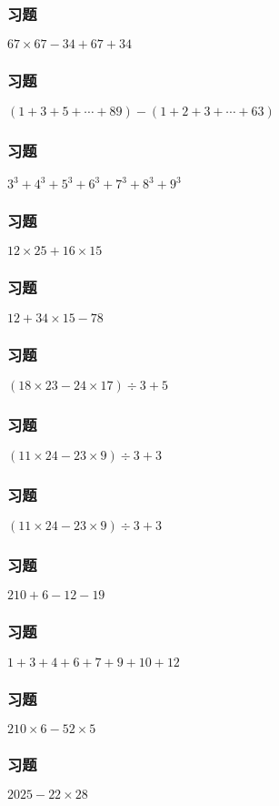 \begin{frame}
    \frametitle{习题\theframecounter}    \centering\textit{\Large $67\times 67 - 34 + 67 + 34$}
\end{frame}

\begin{frame}
    \frametitle{习题\theframecounter}    \centering\textit{\Large $(1+3+5+\cdots + 89) - (1+2+3+\cdots + 63)$}
\end{frame}

\begin{frame}
    \frametitle{习题\theframecounter}    \centering\textit{\Large $3^3 + 4^3 + 5^3 + 6^3 + 7^3 + 8^3 + 9^3$}
\end{frame}

\begin{frame}
    \frametitle{习题\theframecounter}    \centering\textit{\Large $12\times 25 + 16\times 15$}
\end{frame}

\begin{frame}
    \frametitle{习题\theframecounter}    \centering\textit{\Large $12 + 34\times 15 -78$}
\end{frame}

\begin{frame}
    \frametitle{习题\theframecounter}    \centering\textit{\Large $(18\times 23 - 24\times 17)\div 3 + 5$}
\end{frame}

\begin{frame}
    \frametitle{习题\theframecounter}    \centering\textit{\Large $(11\times 24 - 23\times 9)\div 3 + 3$}
\end{frame}

\begin{frame}
    \frametitle{习题\theframecounter}    \centering\textit{\Large $(11\times 24 - 23\times 9)\div 3 + 3$}
\end{frame}

\begin{frame}
    \frametitle{习题\theframecounter}    \centering\textit{\Large $210 + 6-12 - 19$}
\end{frame}

\begin{frame}
    \frametitle{习题\theframecounter}    \centering\textit{\Large $1+3+4+6+7+9+10 + 12$}
\end{frame}

\begin{frame}
    \frametitle{习题\theframecounter}    \centering\textit{\Large $210\times 6 - 52\times 5$}
\end{frame}

\begin{frame}
    \frametitle{习题\theframecounter}    \centering\textit{\Large $2025- 22\times 28$}
\end{frame}